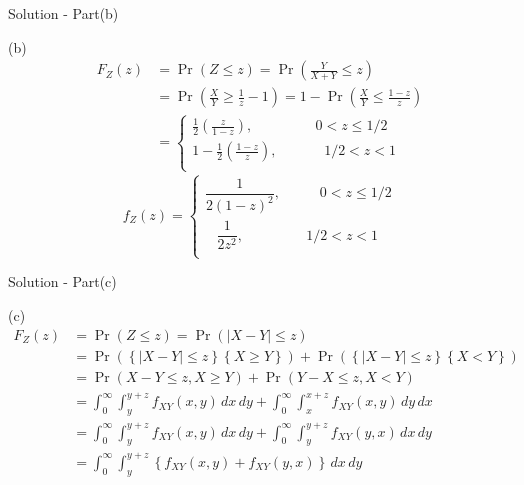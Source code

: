 \documentclass{beamer}
\providecommand{\pr}[1]{\ensuremath{\Pr\left(#1\right)}}
\providecommand{\brak}[1]{\ensuremath{\left(#1\right)}}
\providecommand{\cbrak}[1]{\ensuremath{\left\{#1\right\}}}
\begin{document}
\begin{frame}{Solution - Part(b)}

  (b) \\ 
 \begin{align}
 F_Z(z) &= \pr{Z \le z} = \pr{\tfrac{Y}{X+Y} \le z}\\ 
       &= \pr{\tfrac{X}{Y} \ge \tfrac{1}{z} - 1} = 1 - \pr{\tfrac{X}{Y} \le \tfrac{1-z}{z}}\\
         &= \left\{
                \begin{array}{ll}
                  \frac{1}{2} \brak{\tfrac{z}{1-z}}  ,\;\;\;\;\;\;\;\;\;\;\;\;\;\;\;\;   0 < z \le 1/2 \\
                  1-\tfrac{1}{2} \brak{\tfrac{1-z}{z}} , \;\;\;\;\;\;\;\;\;\;\;  \;  1/2 < z < 1  \\
                  \end{array}
              \right.
\end{align}
\[
        f_Z(z)=\left\{
                \begin{array}{ll}
                  \dfrac{1}{2(1-z)^2}  ,\;\;\;\;\;\;\;\;\;\;   0 < z \le 1/2 \\
                 \;\;\; \dfrac{1}{2z^2} , \;\;\;\;\;\;\;\;\;\;\;  \; \;\;\;\; 1/2 < z < 1  \\
                  \end{array}
              \right.
       \]
\end{frame}
\begin{frame}{Solution - Part(c)}

  (c) \\ 
 \begin{align}
 F_Z(z) &= \pr{Z \le z} = \pr{|X-Y| \le z}\\ 
       &= \pr{\cbrak{|X-Y| \le z}\cbrak{X \ge Y}} + \pr{\cbrak{|X-Y| \le z}\cbrak{X < Y}}\\
       &= \pr{X-Y \le z,X \ge Y} + \pr{Y-X \le z,X < Y}\\   
       &= \int_{0}^{\infty} \int_{y}^{y+z} f_{XY}(x,y) \,dx \,dy + \int_{0}^{\infty} \int_{x}^{x+z} f_{XY}(x,y) \,dy \,dx \\
        &= \int_{0}^{\infty} \int_{y}^{y+z} f_{XY}(x,y) \,dx \,dy + \int_{0}^{\infty} \int_{y}^{y+z} f_{XY}(y,x) \,dx \,dy \\
         &= \int_{0}^{\infty} \int_{y}^{y+z} \cbrak{f_{XY}(x,y) + f_{XY}(y,x) } \,dx \,dy
\end{align}
\end{frame}
\end{document}
